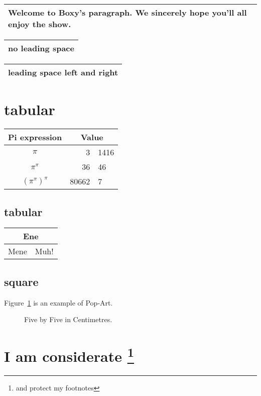 \documentclass[UTF8]{ctexart}
\begin{document}
\begin{tabular}{|p{4.7cm}|}
	\hline
	Welcome to Boxy’s paragraph.
	We sincerely hope you’ll
	all enjoy the show.\\
	\hline
\end{tabular}


\begin{tabular}{@{} l @{}}
	\hline
	no leading space\\
	\hline
\end{tabular}


\begin{tabular}{l}
	\hline
	leading space left and right\\
	\hline
\end{tabular}
\section{tabular}
\begin{tabular}{c r @{.} l}
	Pi expression &
	\multicolumn{2}{c}{Value} \\
	\hline
	$\pi$ & 3&1416 \\
	$\pi^{\pi}$ & 36&46 \\
	$(\pi^{\pi})^{\pi}$ & 80662&7 \\
\end{tabular}

\subsection{tabular}
\begin{tabular}{|c|c|}
	\hline
	\multicolumn{2}{|c|}{Ene} \\
	\hline
	Mene & Muh! \\
	\hline
\end{tabular}

\subsection{square}

Figure~\ref{white} is an example of Pop-Art.
\begin{figure}[!hbp]
	\makebox[\textwidth]{\framebox[5cm]{\rule{0pt}{5cm}}}
	\caption{Five by Five in Centimetres.} \label{white}
\end{figure}


\section{I am considerate
	\protect\footnote{and protect my footnotes}}
\end{document}
